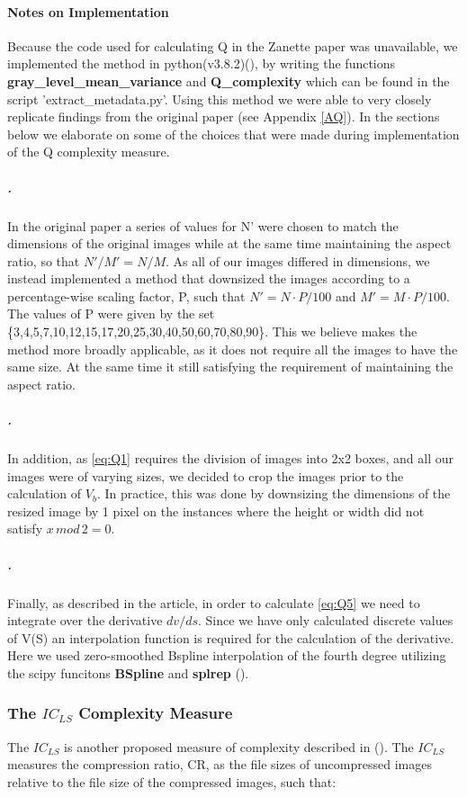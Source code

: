\documentclass[12pt]{article}
\begin{document}
\paragraph{Notes on Implementation}
Because the code used for calculating Q in the Zanette paper was unavailable, we implemented the method in python(v3.8.2)(\cite{pythonsoftwarefoundationPython2020}), by writing the functions \textbf{gray\_level\_mean\_variance} and \textbf{Q\_complexity} which can be found in the script 'extract\_metadata.py'. Using this method we were able to very closely replicate findings from the original paper (see Appendix \ref{AQ}). In the sections below we elaborate on some of the choices that were made during implementation of the Q complexity measure.
\subparagraph{.}
In the original paper a series of values for N' were chosen to match the dimensions of the original images while at the same time maintaining the aspect ratio, so that $N'/M' = N/M$. As all of our images differed in dimensions, we instead implemented a method that downsized the images according to a percentage-wise scaling factor, P, such that $N' = N \cdot P/100$ and $M' = M \cdot P/100$. The values of P were given by the set \{3,4,5,7,10,12,15,17,20,25,30,40,50,60,70,80,90\}. This we believe makes the method more broadly applicable, as it does not require all the images to have the same size. At the same time it still satisfying the requirement of maintaining the aspect ratio.
\subparagraph{.}
In addition, as \ref{eq:Q1} requires the division of images into 2x2 boxes, and all our images were of varying sizes, we decided to crop the images prior to the calculation of $V_b$. In practice, this was done by downsizing the dimensions of the resized image by 1 pixel on the instances where the height or width did not satisfy $x\,mod\,2 = 0$.
\subparagraph{.}
Finally, as described in the article, in order to calculate \ref{eq:Q5} we need to integrate over the derivative $dv/ds$. 
Since we have only calculated discrete values of V(S) an interpolation function is required for the calculation of the derivative. Here we used zero-smoothed Bspline interpolation of the fourth degree utilizing the scipy funcitons \textbf{BSpline} and \textbf{splrep} (\cite{virtanenSciPyFundamentalAlgorithms2020}).

\subsubsection{The $IC_{LS}$ Complexity Measure}\label{ICLS}
The $IC_{LS}$ is another proposed measure of complexity described in (\cite{yuImageComplexitySpatial2013}). 
The $IC_{LS}$ measures the compression ratio, CR, as the file sizes of uncompressed images relative to the file size of the compressed images, such that:
\end{document}

